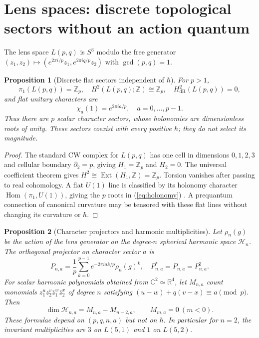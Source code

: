 \documentclass[11pt,a4paper]{article}
\newtheorem{proposition}{Proposition}[section]
\newcommand{\h}{\hbar}
\newcommand{\R}{\mathbb R}
\newcommand{\C}{\mathbb C}
\newcommand{\Z}{\mathbb Z}
\begin{document}
\section{Lens spaces: discrete topological sectors without an action quantum}
The lens space $L(p,q)$ is $S^3$ modulo the free generator $(z_1,z_2)\mapsto(e^{2\pi i/p}z_1,e^{2\pi iq/p}z_2)$ with $\gcd(p,q)=1$.
\begin{proposition}[Discrete flat sectors independent of $\h$]\label{pr:flat}
For $p>1$,
\begin{equation}
 \pi_1(L(p,q))=\Z_p,\quad H^2(L(p,q);\Z)\cong\Z_p,\quad
 H^2_{\mathrm{dR}}(L(p,q))=0,
\end{equation}
and flat unitary characters are
\begin{equation}\label{eq:holonomy}
 \chi_a(1)=e^{2\pi ia/p},\quad a=0,\ldots,p-1.
\end{equation}
Thus there are $p$ scalar character sectors, whose holonomies are dimensionless roots of unity. These sectors coexist with every positive $\h$; they do not select its magnitude.
\end{proposition}
\begin{proof} The standard CW complex for $L(p,q)$ has one cell in dimensions $0,1,2,3$ and cellular boundary $\partial_2=p$, giving $H_1=\Z_p$ and $H_2=0$. The universal coefficient theorem gives $H^2\cong\operatorname{Ext}(H_1,\Z)=\Z_p$. Torsion vanishes after passing to real cohomology. A flat $U(1)$ line is classified by its holonomy character $\operatorname{Hom}(\pi_1,U(1))$, giving the $p$ roots in (\ref{eq:holonomy}) \cite{ImboSudarshan}. A prequantum connection of canonical curvature may be tensored with these flat lines without changing its curvature or $\h$.\end{proof}
\begin{proposition}[Character projectors and harmonic multiplicities]\label{pr:projector}
Let $\rho_n(g)$ be the action of the lens generator on the degree-$n$ spherical harmonic space $\mathcal H_n$. The orthogonal projector on character sector $a$ is
\begin{equation}\label{eq:proj}
 P_{n,a}=\frac1p\sum_{k=0}^{p-1}e^{-2\pi i ak/p}\rho_n(g)^k,
 \quad P_{n,a}^*=P_{n,a}=P_{n,a}^2.
\end{equation}
For scalar harmonic polynomials obtained from $\C^2\simeq\R^4$, let $M_{n,a}$ count monomials $z_1^{u}z_2^{v}\bar z_1^{w}\bar z_2^{x}$ of degree $n$ satisfying $(u-w)+q(v-x)\equiv a\pmod p$. Then
\begin{equation}\label{eq:count}
 \dim\mathcal H_{n,a}=M_{n,a}-M_{n-2,a},\qquad M_{m,a}=0\ (m<0).
\end{equation}
These formulae depend on $(p,q,n,a)$ but not on $\h$. In particular for $n=2$, the invariant multiplicities are $3$ on $L(5,1)$ and $1$ on $L(5,2)$.
\end{proposition}
\end{document}
